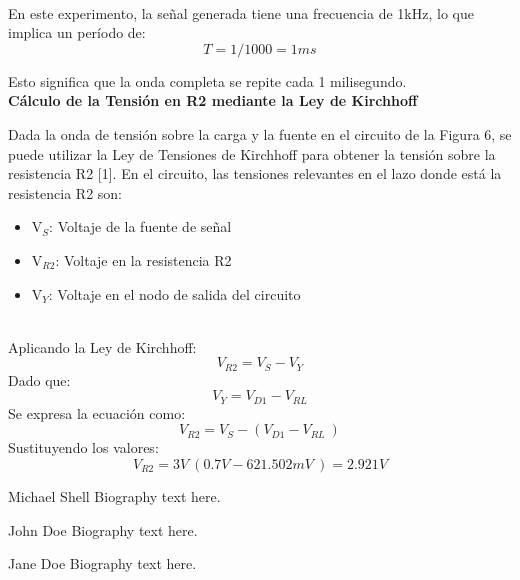 \documentclass[journal]{IEEEtran}
\begin{document}
\\
\newline
\par En este experimento, la señal generada tiene una frecuencia de 1kHz, lo que implica un período de:
\begin{equation}
    T=1/1000=1ms
\end{equation}
\par Esto significa que la onda completa se repite cada 1 milisegundo. 
\\
\newline
\textbf{Cálculo de la Tensión en R2 mediante la Ley de Kirchhoff}
\par Dada la onda de tensión sobre la carga y la fuente en el circuito de la Figura 6, se puede utilizar la Ley de Tensiones de Kirchhoff para obtener la tensión sobre la resistencia R2 [1]. En el circuito, las tensiones relevantes en el lazo donde está la resistencia R2 son:
\begin{itemize}
	\item V$_S$: Voltaje de la fuente de señal
	\item V$_{R2}$: Voltaje en la resistencia R2
	\item V$_Y$: Voltaje en el nodo de salida del circuito
\end{itemize}
\\
\newline
Aplicando la Ley de Kirchhoff:
\begin{equation}
    V_{R2}=V_S-V_Y
\end{equation}
Dado que:
\begin{equation}
    V_Y=V_{D1}-V_{RL}
\end{equation}
Se expresa la ecuación como:
\begin{equation}
    V_{R2}=V_S-(V_{D1}-V_{RL}\ )
\end{equation}
Sustituyendo los valores:
\begin{equation}
    V_{R2}=3V \ (0.7V-621.502mV\ )=2.921V
\end{equation}


\ifCLASSOPTIONcaptionsoff
  \newpage
\fi


\begin{IEEEbiography}{Michael Shell}
Biography text here.
\end{IEEEbiography}

\begin{IEEEbiographynophoto}{John Doe}
Biography text here.
\end{IEEEbiographynophoto}

\begin{IEEEbiographynophoto}{Jane Doe}
Biography text here.
\end{IEEEbiographynophoto}
\end{document}
